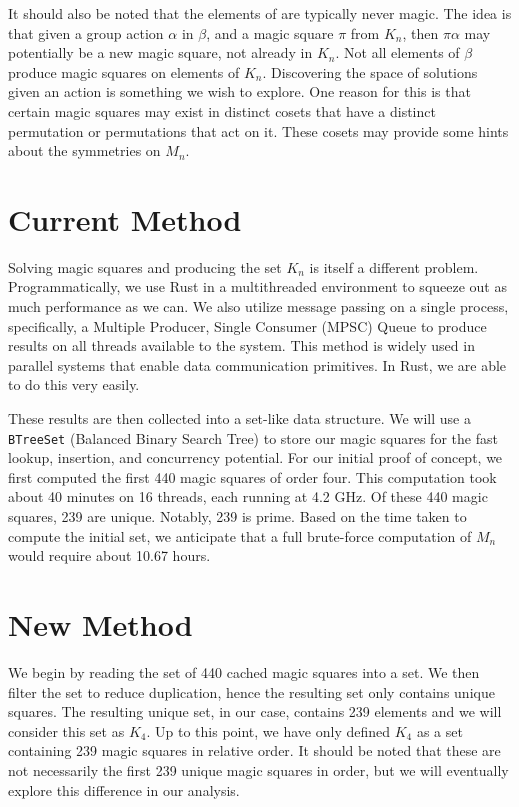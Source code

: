 \documentclass[12pt]{report}
\begin{document}
\par It should also be noted that the elements of  are typically never magic. The idea is that
given a group action $\alpha$ in $\beta$, and a magic square $\pi$ from $K_n$, then $\pi\alpha$ may
potentially be a new magic square, not already in $K_n$. Not all elements of $\beta$ produce magic
squares on elements of $K_n$. Discovering the space of solutions given an action is something we
wish to explore. One reason for this is that certain magic squares may exist in distinct cosets
that have a distinct permutation or permutations that act on it. These cosets may provide some
hints about the symmetries on $M_n$.

\section{Current Method}

\par Solving magic squares and producing the set $K_n$ is itself a different problem.
Programmatically, we use Rust in a multithreaded environment to squeeze out as much performance as
we can. We also utilize message passing on a single process, specifically, a Multiple Producer,
Single Consumer (MPSC) Queue to produce results on all threads available to the system. This method
is widely used in parallel systems that enable data communication primitives. In Rust, we are able
to do this very easily.

\par These results are then collected into a set-like data structure. We will use a
\texttt{BTreeSet} (Balanced Binary Search Tree) to store our magic squares for the fast lookup,
insertion, and concurrency potential. For our initial proof of concept, we first computed the first
440 magic squares of order four. This computation took about 40 minutes on 16 threads, each running
at 4.2 GHz. Of these 440 magic squares, 239 are unique. Notably, 239 is prime. Based on the time
taken to compute the initial set, we anticipate that a full brute-force computation of $M_n$ would
require about 10.67 hours.

\section{New Method}
\par We begin by reading the set of 440 cached magic squares into a set. We then filter the set to
reduce duplication, hence the resulting set only contains unique squares. The resulting unique set,
in our case, contains 239 elements and we will consider this set as $K_4$. Up to this point, we
have only defined $K_4$ as a set containing 239 magic squares in relative order. It should be noted
that these are not necessarily the first 239 unique magic squares in order, but we will eventually
explore this difference in our analysis.
\end{document}
